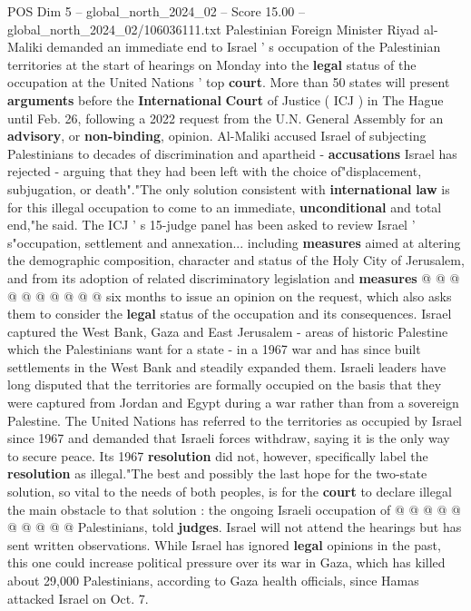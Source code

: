 \begin{textsample}{POS Dim 5 – global\_north\_2024\_02 – Score 15.00 – global\_north\_2024\_02/106036111.txt}  \label{ex:f5_pos_250}
Palestinian Foreign Minister Riyad al-Maliki demanded an immediate end to Israel ' s occupation of the Palestinian territories at the start of hearings on Monday into the \textbf{legal} status of the occupation at the United Nations ' top \textbf{court}.
More than 50 states will present \textbf{arguments} before the \textbf{International} \textbf{Court} of Justice ( ICJ ) in The Hague until Feb. 26, following a 2022 request from the U.N.
General Assembly for an \textbf{advisory}, or \textbf{non-binding}, opinion.
Al-Maliki accused Israel of subjecting Palestinians to decades of discrimination and apartheid - \textbf{accusations} Israel has rejected - arguing that they had been left with the choice of"displacement, subjugation, or death"."The only solution consistent with \textbf{international} \textbf{law} is for this illegal occupation to come to an immediate, \textbf{unconditional} and total end,"he said.
The ICJ ' s 15-judge panel has been asked to review Israel ' s"occupation, settlement and annexation... including \textbf{measures} aimed at altering the demographic composition, character and status of the Holy City of Jerusalem, and from its adoption of related discriminatory legislation and \textbf{measures} @ @ @ @ @ @ @ @ @ @ six months to issue an opinion on the request, which also asks them to consider the \textbf{legal} status of the occupation and its consequences.
Israel captured the West Bank, Gaza and East Jerusalem - areas of historic Palestine which the Palestinians want for a state - in a 1967 war and has since built settlements in the West Bank and steadily expanded them.
Israeli leaders have long disputed that the territories are formally occupied on the basis that they were captured from Jordan and Egypt during a war rather than from a sovereign Palestine.
The United Nations has referred to the territories as occupied by Israel since 1967 and demanded that Israeli forces withdraw, saying it is the only way to secure peace.
Its 1967 \textbf{resolution} did not, however, specifically label the \textbf{resolution} as illegal."The best and possibly the last hope for the two-state solution, so vital to the needs of both peoples, is for the \textbf{court} to declare illegal the main obstacle to that solution : the ongoing Israeli occupation of @ @ @ @ @ @ @ @ @ @ Palestinians, told \textbf{judges}.
Israel will not attend the hearings but has sent written observations.
While Israel has ignored \textbf{legal} opinions in the past, this one could increase political pressure over its war in Gaza, which has killed about 29,000 Palestinians, according to Gaza health officials, since Hamas attacked Israel on Oct. 7.

\end{textsample}
